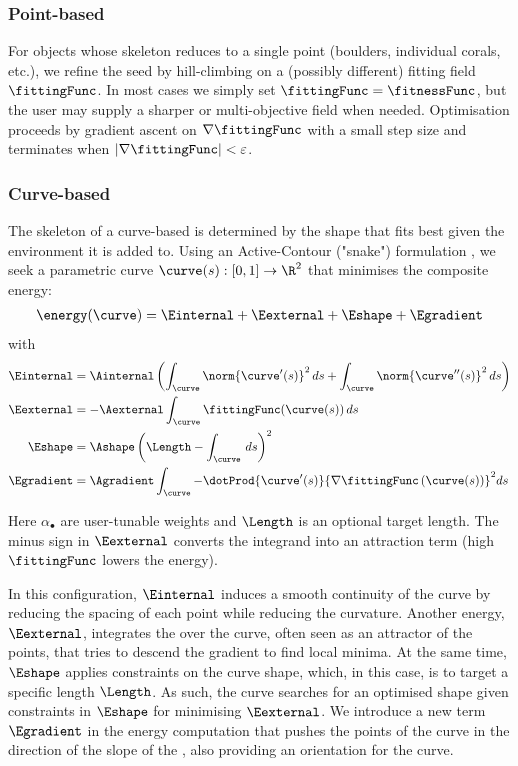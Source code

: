 \subsubsection{Point-based }

For objects whose skeleton reduces to a single point (boulders, individual corals, etc.), we refine the seed by hill-climbing on a (possibly different) fitting field $\fittingFunc$. In most cases we simply set $\fittingFunc = \fitnessFunc$, but the user may supply a sharper or multi-objective field when needed. Optimisation proceeds by gradient ascent on $\nabla\fittingFunc$ with a small step size and terminates when $|\nabla \fittingFunc|<\varepsilon$.

\subsubsection{Curve-based }

The skeleton of a curve-based  is determined by the shape that fits best given the environment it is added to.
Using an Active-Contour ("snake") formulation \cite{Kass1988}, we seek a parametric curve $\curve(s) : [0,1] \to \R^{2}$ that minimises the composite energy:
\begin{align}
    \energy(\curve) = \Einternal + \Eexternal + \Eshape + \Egradient
\end{align}
with
\begin{align}
    \label{eq:env-obj-snake-energy-equation-internal}
    \Einternal &= \Ainternal \left( \int_{\curve}{ \norm{\curve'(s)}^2 \, ds} + \int_{\curve}{ \norm{\curve''(s)}^2 \, ds} \right) \\
    \label{eq:env-obj-snake-energy-equation-external}
    \Eexternal &= -\Aexternal \int_{\curve}{ \fittingFunc(\curve(s)) \, ds } \\
    \label{eq:env-obj-snake-energy-equation-shape}
    \Eshape &= \Ashape \left( \Length - \int_{\curve}{ \, ds } \right)^2 \\
    \label{eq:env-obj-snake-energy-equation-gradient}
    \Egradient &= \Agradient \int_{\curve}{-\dotProd{\curve'(s)}{\nabla\fittingFunc\left(\curve(s)\right)}^2 ds}
\end{align}

Here $\alpha_{\bullet}$ are user-tunable weights and $\Length$ is an optional target length. The minus sign in $\Eexternal$ converts the integrand into an attraction term (high $\fittingFunc$ lowers the energy).

In this configuration, $\Einternal$ induces a smooth continuity of the curve by reducing the spacing of each point while reducing the curvature. Another energy, $\Eexternal$, integrates the  over the curve, often seen as an attractor of the points, that tries to descend the gradient to find local minima. At the same time, $\Eshape$ applies constraints on the curve shape, which, in this case, is to target a specific length $\Length$. As such, the curve searches for an optimised shape given constraints in $\Eshape$ for minimising $\Eexternal$. We introduce a new term $\Egradient$ in the energy computation that pushes the points of the curve in the direction of the slope of the , also providing an orientation for the curve.

